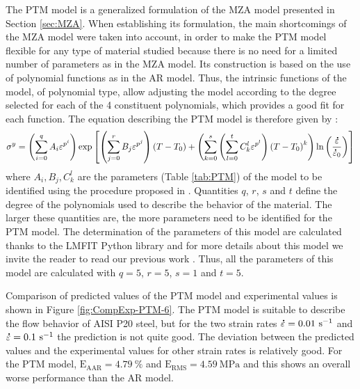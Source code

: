 \documentclass[twoside,english,1p,final,sort&compress]{elsarticle}
\theoremstyle{plain}
\DeclareRobustCommand{\mdot}[1]{\accentset{\mbox{\bfseries .}}{#1}}
\DeclareRobustCommand{\RMSE}{\text{E}_\text{RMS}}
\DeclareRobustCommand{\AARE}{\text{E}_\text{AAR}}
\DeclareRobustCommand{\ps}{\text{s}^{-1}}
\begin{document}
The PTM model \cite{TizeMha-2022} is a generalized formulation of the MZA model presented in Section \ref{sec:MZA}.
When establishing its formulation, the main shortcomings of the MZA model were taken into account, in order to make the PTM model flexible for any type of material studied because there is no need for a limited number of parameters as in the MZA model.
Its construction is based on the use of polynomial functions as in the AR model.
Thus, the intrinsic functions of the model, of polynomial type, allow adjusting the model according to the degree selected for each of the 4 constituent polynomials, which provides a good fit for each function.
The equation describing the PTM model is therefore given by :
\begin{equation}
\label{eq:PTM-model}
\sigma^y = \left(\sum_{i=0}^{q}{A_i\varepsilon^{p^i}}\right) \exp\left[\left(\sum_{j=0}^{r}{B_j\varepsilon^{p^j}}\right)\left(T-T_0\right) + \left(\sum_{k=0}^{s}\left(\sum_{l=0}^{t}{C_k^l\varepsilon^{p^l}} \right)\left(T-T_0\right)^k \right)\ln\left( \frac{\mdot\varepsilon}{\mdot{\varepsilon}_0}\right)\right]
\end{equation}
where $A_i, B_j, C_k^l$ are the parameters (Table \ref{tab:PTM}) of the model to be identified using the procedure proposed in  \cite{TizeMha-2022}.
Quantities $q$, $r$, $s$ and $t$ define the degree of the polynomials used to describe the behavior of the material.
The larger these quantities are, the more parameters need to be identified for the PTM model.
The determination of the parameters of this model are calculated thanks to the LMFIT Python library \cite{Newville-2016} and for more details about this model  we invite the reader to read our previous work \cite{TizeMha-2022}.
Thus, all the parameters of this model are calculated with $q=5$, $r=5$, $s=1$ and $t=5$.

Comparison of predicted values of the PTM model and experimental values is shown in Figure \ref{fig:CompExp-PTM-6}.
The PTM model is suitable to describe the ﬂow behavior of AISI P20 steel, but for the two strain rates $\mdot\varepsilon=0.01~\ps$ and $\mdot\varepsilon=0.1~\ps$ the prediction is not quite good.
The deviation between the predicted values and the experimental values for other strain rates is relatively good.
For the PTM model, $\AARE=4.79~\%$ and $\RMSE=4.59~\text{MPa}$ and this shows an overall worse performance than the AR model.
\end{document}
